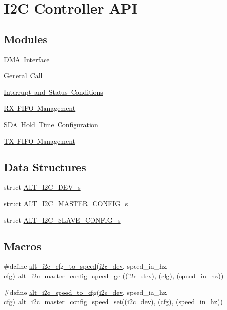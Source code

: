 \hypertarget{group__ALT__I2C}{}\section{I2C Controller A\+PI}
\label{group__ALT__I2C}
\subsection*{Modules}
\begin{DoxyCompactItemize}
\item 
\mbox{\hyperlink{group__ALT__I2C__DMA}{D\+M\+A Interface}}
\item 
\mbox{\hyperlink{group__ALT__I2C__GEN__CALL}{General Call}}
\item 
\mbox{\hyperlink{group__ALT__I2C__INT}{Interrupt and Status Conditions}}
\item 
\mbox{\hyperlink{group__ALT__I2C__RX__FIFO}{R\+X F\+I\+F\+O Management}}
\item 
\mbox{\hyperlink{group__ALT__I2C__SDA__HOLD}{S\+D\+A Hold Time Configuration}}
\item 
\mbox{\hyperlink{group__ALT__I2C__TX__FIFO}{T\+X F\+I\+F\+O Management}}
\end{DoxyCompactItemize}
\subsection*{Data Structures}
\begin{DoxyCompactItemize}
\item 
struct \mbox{\hyperlink{structALT__I2C__DEV__s}{A\+L\+T\+\_\+\+I2\+C\+\_\+\+D\+E\+V\+\_\+s}}
\item 
struct \mbox{\hyperlink{structALT__I2C__MASTER__CONFIG__s}{A\+L\+T\+\_\+\+I2\+C\+\_\+\+M\+A\+S\+T\+E\+R\+\_\+\+C\+O\+N\+F\+I\+G\+\_\+s}}
\item 
struct \mbox{\hyperlink{structALT__I2C__SLAVE__CONFIG__s}{A\+L\+T\+\_\+\+I2\+C\+\_\+\+S\+L\+A\+V\+E\+\_\+\+C\+O\+N\+F\+I\+G\+\_\+s}}
\end{DoxyCompactItemize}
\subsection*{Macros}
\begin{DoxyCompactItemize}
\item 
\#define \mbox{\hyperlink{group__ALT__I2C_gac5671984a2084fced59a4c2b55a80171}{alt\+\_\+i2c\+\_\+cfg\+\_\+to\+\_\+speed}}(\mbox{\hyperlink{structi2c__dev}{i2c\+\_\+dev}},  speed\+\_\+in\+\_\+hz,  cfg)~\mbox{\hyperlink{group__ALT__I2C_ga90d8a89d7b447bede11a9c1c79ea3b99}{alt\+\_\+i2c\+\_\+master\+\_\+config\+\_\+speed\+\_\+get}}((\mbox{\hyperlink{structi2c__dev}{i2c\+\_\+dev}}), (cfg), (speed\+\_\+in\+\_\+hz))
\item 
\#define \mbox{\hyperlink{group__ALT__I2C_ga00ab3f8d3299c796d4c3624db67e4f79}{alt\+\_\+i2c\+\_\+speed\+\_\+to\+\_\+cfg}}(\mbox{\hyperlink{structi2c__dev}{i2c\+\_\+dev}},  speed\+\_\+in\+\_\+hz,  cfg)~\mbox{\hyperlink{group__ALT__I2C_gab7a9d3d9d126cce421b7a9e0254b2a6e}{alt\+\_\+i2c\+\_\+master\+\_\+config\+\_\+speed\+\_\+set}}((\mbox{\hyperlink{structi2c__dev}{i2c\+\_\+dev}}), (cfg), (speed\+\_\+in\+\_\+hz))
\end{DoxyCompactItemize}

